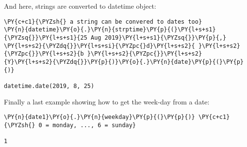 And here, strings are converted to datetime object:

\begin{tcolorbox}[breakable, size=fbox, boxrule=1pt, pad at break*=1mm,colback=cellbackground, colframe=cellborder]
\begin{Verbatim}[commandchars=\\\{\}]
\PY{c+c1}{\PYZsh{} a string can be convered to dates too}
\PY{n}{datetime}\PY{o}{.}\PY{n}{strptime}\PY{p}{(}\PY{l+s+s1}{\PYZsq{}}\PY{l+s+s1}{25 Aug 2019}\PY{l+s+s1}{\PYZsq{}}\PY{p}{,} \PY{l+s+s2}{\PYZdq{}}\PY{l+s+si}{\PYZpc{}d}\PY{l+s+s2}{ }\PY{l+s+s2}{\PYZpc{}}\PY{l+s+s2}{b }\PY{l+s+s2}{\PYZpc{}}\PY{l+s+s2}{Y}\PY{l+s+s2}{\PYZdq{}}\PY{p}{)}\PY{o}{.}\PY{n}{date}\PY{p}{(}\PY{p}{)}

datetime.date(2019, 8, 25)
\end{Verbatim}
\end{tcolorbox}

Finally a last example showing how to get the week-day from a date:

\begin{tcolorbox}[breakable, size=fbox, boxrule=1pt, pad at break*=1mm,colback=cellbackground, colframe=cellborder]
\begin{Verbatim}[commandchars=\\\{\}]
\PY{n}{date1}\PY{o}{.}\PY{n}{weekday}\PY{p}{(}\PY{p}{)} \PY{c+c1}{\PYZsh{} 0 = monday, ..., 6 = sunday}

1
\end{Verbatim}
\end{tcolorbox}
